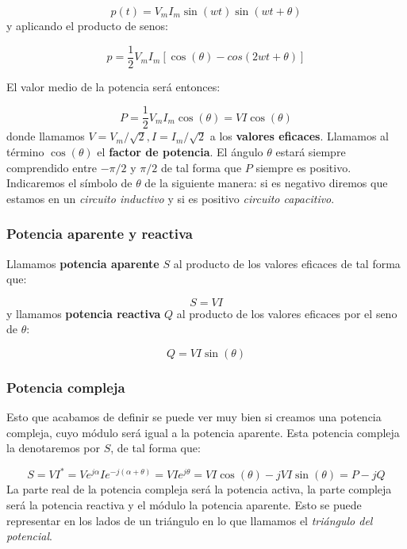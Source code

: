 \documentclass[12pt,a4paper]{article}
\begin{document}
\begin{equation}
p(t) = V_m I_m \sin (wt) \sin (wt + \theta)
\end{equation}
y aplicando el producto de senos:

\begin{equation}
p = \dfrac{1}{2} V_m I_m [\cos (\theta) - cos(2wt+\theta)]
\end{equation}

El valor medio de la potencia será entonces:

\begin{equation}
P = \dfrac{1}{2} V_m I_m \cos (\theta) = V I \cos (\theta)
\end{equation}
donde llamamos $V = V_m/\sqrt{2}, I = I_m / \sqrt{2}$ a los \textbf{valores eficaces}. Llamamos al término $\cos ( \theta )$ el \textbf{factor de potencia}. El ángulo $\theta$ estará siempre comprendido entre $-\pi/2$ y $\pi/2$ de tal forma que $P$ siempre es positivo. Indicaremos el símbolo de $\theta$ de la siguiente manera: si es negativo diremos que estamos en un \textit{circuito inductivo} y si es positivo \textit{circuito capacitivo}. 


\subsubsection{Potencia aparente y reactiva}

Llamamos \textbf{potencia aparente} $S$ al producto de los valores eficaces de tal forma que:

\begin{equation}
S = VI
\end{equation}
y llamamos \textbf{potencia reactiva} $Q$ al producto de los valores eficaces por el seno de $\theta$:

\begin{equation}
Q = VI \sin (\theta)
\end{equation}

\subsubsection{Potencia compleja}

Esto que acabamos de definir se puede ver muy bien si creamos una potencia compleja, cuyo módulo será igual a la potencia aparente. Esta potencia compleja la denotaremos por $S$, de tal forma que:

\begin{equation}
S = V I^* = Ve^{j \alpha} I e^{-j(\alpha + \theta)} = VI e^{j \theta} = VI \cos (\theta) - j VI \sin (\theta) = P - j Q
\end{equation}
La parte real de la potencia compleja será la potencia activa, la parte compleja será la potencia reactiva y el módulo la potencia aparente. Esto se puede representar en los lados de un triángulo en lo que llamamos el \textit{triángulo del potencial}.
\end{document}
